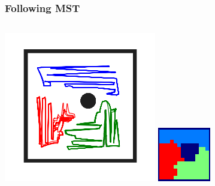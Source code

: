 \documentclass{beamer}
\begin{document}
	\begin{frame}
		\frametitle{Following MST}
		\begin{columns}
			\includegraphics[width=\columnwidth]{dec2.png}
			\includegraphics[width=\columnwidth]{owned_regions_2.png}
		\end{columns}
		
	\end{frame}
	
\end{document}
